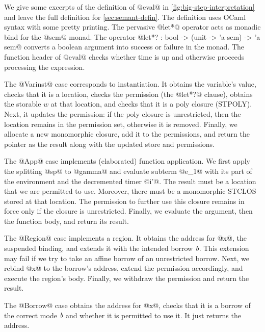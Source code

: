 

We give some excerpts of the definition of @eval@ in
\cref{fig:big-step-interpretation} and leave the full
definition for \cref{sec:semant-defin}.
The definition uses OCaml syntax with some pretty
printing. The pervasive @let*@ operator acts as monadic bind
for the @sem@ monad. The operator
@let*? : bool -> (unit -> 'a sem) -> 'a sem@
 converts a boolean
argument into success or failure in the monad.
 The function header of @eval@ checks
whether time is up and otherwise proceeds processing the expression.

The @Varinst@ case corresponds to instantiation. It
obtains the variable's value, checks that it is a location, checks the
permission (the @let*?@ clause), obtains the storable $w$ at that
location, and checks that it is a poly closure (STPOLY). Next, it updates the
permission: if the poly closure is unrestricted, then the location
remains in the permission set, otherwise it is removed. Finally, we
allocate a new monomorphic closure, add it to the permissions, and
return the pointer as the result along with the updated store and
permissions.

The @App@ case implements (elaborated) function application.
We first apply the splitting @sp@ to @gamma@ and
evaluate subterm @e_1@ with its part of the environment and the
decremented timer @i'@. The result must be a location that we are
permitted to use. Moreover, there must be a monomorphic STCLOS stored
at that location. The permission to further use this closure  remains
in force only if the closure is unrestricted. Finally, we evaluate the
argument, then the function body, and return its result.



The @Region@ case implements a region. It obtains the address for @x@,
the suspended binding, and extends it with the intended borrow
$\textit{b}$. This extension may fail if we try to take an affine borrow
of an unrestricted borrow. Next, we rebind @x@ to the borrow's
address, extend the permission accordingly, and execute the region's
body.  Finally, we withdraw the permission and return the result.

The @Borrow@ case obtains the address for @x@, checks that it is a
borrow of the correct mode $\textit{b}$ and whether it is permitted to
use it. It just returns the address.

\lstDeleteShortInline@

